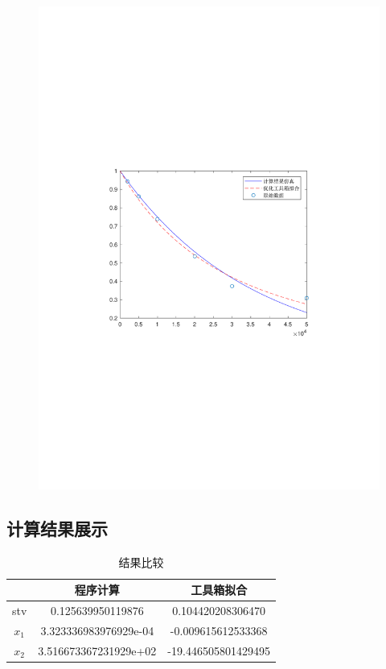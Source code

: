 \begin{figure}[H]
\centering
\includegraphics[width=12cm]{fig/6_2.pdf}
\end{figure}

\subsection{计算结果展示}
\begin{table}[H]
\centering
\caption{结果比较}
	\begin{tabular}{ccc}
	\toprule
	{}&程序计算&工具箱拟合\\
	\midrule
	stv&0.125639950119876&0.104420208306470\\
	$x_1$&3.323336983976929e-04&-0.009615612533368\\
	$x_2$&3.516673367231929e+02&-19.446505801429495\\
	\bottomrule
	\end{tabular}
\end{table}


